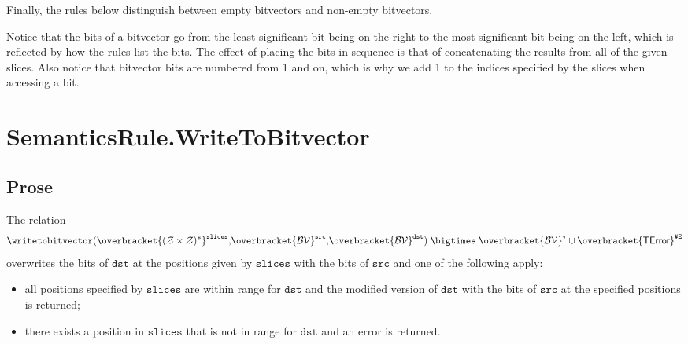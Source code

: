 \documentclass{book}
\newcommand\eqdef[0]{:=}
\newcommand\overname[2]{\overbracket{#1}^{#2}}
\newcommand\nvbitvector[0]{\texttt{Bitvector}}
\newcommand\tint[0]{\mathcal{Z}}
\newcommand\tbitvector[0]{\mathcal{B}\mathcal{V}}
\newcommand\evalarrow[0]{\stackrel{\mathsf{asl}}{\rightsquigarrow}}
\newcommand\aslsep[0]{\mathbf{,}}
\newcommand\sslash[0]{\mathbin{/\mkern-6mu/}}
\newcommand\terminateas[0]{\;\sslash\;}
\newcommand\ErrorConfig[0]{\texttt{\#E}}
\newcommand\TError[0]{\textsf{TError}}
\newcommand\vv[0]{\texttt{v}}
\newcommand\slices[0]{\texttt{slices}}
\newcommand\vb[0]{\texttt{b}}
\newcommand\bv[0]{\texttt{bv}}
\newcommand\src[0]{\texttt{src}}
\newcommand\dst[0]{\texttt{dst}}
\begin{document}
\begin{emptyformal}
Finally, the rules below distinguish between empty bitvectors and non-empty bitvectors.
Notice that the bits of a bitvector go from the least significant bit being on the right to the most significant bit being on the left,
which is reflected by how the rules list the bits.
The effect of placing the bits in sequence is that of concatenating the results
from all of the given slices.
Also notice that bitvector bits are numbered from 1 and on, which is why we add 1 to the indices specified
by the slices when accessing a bit.
\end{emptyformal}

\section{SemanticsRule.WriteToBitvector \label{sec:SemanticsRule.WriteToBitvector}}
\subsection{Prose}
The relation
\[
  \writetobitvector(\overname{(\tint\times\tint)^*}{\slices} \aslsep \overname{\tbitvector}{\src} \aslsep \overname{\tbitvector}{\dst})
  \;\bigtimes\; \overname{\tbitvector}{\vv} \cup \overname{\TError}{\ErrorConfig}
\]
overwrites the bits of $\dst$ at the positions given by $\slices$ with the bits of $\src$
and one of the following apply:
\begin{itemize}
  \item all positions specified by $\slices$ are within range for $\dst$ and the modified version
  of $\dst$ with the bits of $\src$ at the specified positions is returned;
  \item there exists a position in $\slices$ that is not in range for $\dst$ and an error is returned.
\end{itemize}
\end{document}
